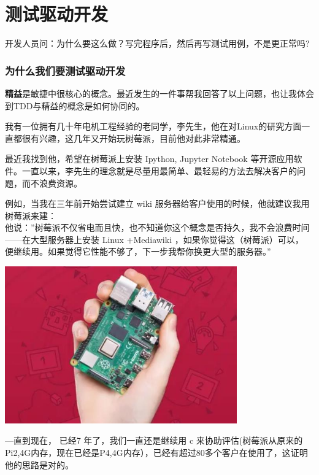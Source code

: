 \chapter{测试驱动开发} %

开发人员问：为什么要这么做？写完程序后，然后再写测试用例，不是更正常吗?

\hypertarget{ux4e3aux4ec0ux4e48ux6211ux4eecux8981ux6d4bux8bd5ux9a71ux52a8ux5f00ux53d1}{%
\subsection{为什么我们要测试驱动开发}\label{ux4e3aux4ec0ux4e48ux6211ux4eecux8981ux6d4bux8bd5ux9a71ux52a8ux5f00ux53d1}}

\textbf{精益}是敏捷中很核心的概念。最近发生的一件事帮我回答了以上问题，也让我体会到TDD与精益的概念是如何协同的。

我有一位拥有几十年电机工程经验的老同学，李先生，他在对Linux的研究方面一直都很有兴趣，这几年又开始玩树莓派，目前他对此非常精通。

最近我找到他，希望在树莓派上安装 Ipython, Jupyter Notebook
等开源应用软件。一直以来，李先生的理念就是尽量用最简单、最轻易的方法去解决客户的问题，而不浪费资源。

例如，当我在三年前开始尝试建立 wiki
服务器给客户使用的时候，他就建议我用树莓派来建：\\
他说：''树莓派不仅省电而且快，也不知道你这个概念是否持久，我不会浪费时间------在大型服务器上安装
Linux +Mediawiki ，如果你觉得这（树莓派）可以，
便继续用。如果觉得它性能不够了，下一步我帮你换更大型的服务器。''


\includegraphics[width=10cm]{树莓派2.jpg}

---直到现在， 已经7 年了，我们一直还是继续用 c
来协助评估(树莓派从原来的Pi2,4G内存，现在已经是P4,4G内存），已经有超过80多个客户在使用了，这证明他的思路是对的。


